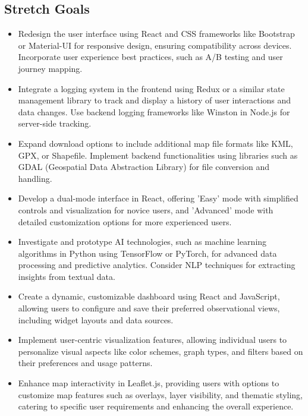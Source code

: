 \documentclass[12pt]{article}
\begin{document}
\subsection*{Stretch Goals}
\begin{itemize}
    \item  Redesign the user interface using React and CSS frameworks like Bootstrap or Material-UI for responsive design, ensuring compatibility across devices. Incorporate user experience best practices, such as A/B testing and user journey mapping.
    \item Integrate a logging system in the frontend using Redux or a similar state management library to track and display a history of user interactions and data changes. Use backend logging frameworks like Winston in Node.js for server-side tracking.
    \item Expand download options to include additional map file formats like KML, GPX, or Shapefile. Implement backend functionalities using libraries such as GDAL (Geospatial Data Abstraction Library) for file conversion and handling.
    \item Develop a dual-mode interface in React, offering 'Easy' mode with simplified controls and visualization for novice users, and 'Advanced' mode with detailed customization options for more experienced users.
    \item Investigate and prototype AI technologies, such as machine learning algorithms in Python using TensorFlow or PyTorch, for advanced data processing and predictive analytics. Consider NLP techniques for extracting insights from textual data.
    \item Create a dynamic, customizable dashboard using React and JavaScript, allowing users to configure and save their preferred observational views, including widget layouts and data sources.
    \item Implement user-centric visualization features, allowing individual users to personalize visual aspects like color schemes, graph types, and filters based on their preferences and usage patterns.
    \item Enhance map interactivity in Leaflet.js, providing users with options to customize map features such as overlays, layer visibility, and thematic styling, catering to specific user requirements and enhancing the overall experience.
\end{itemize}
\end{document}
